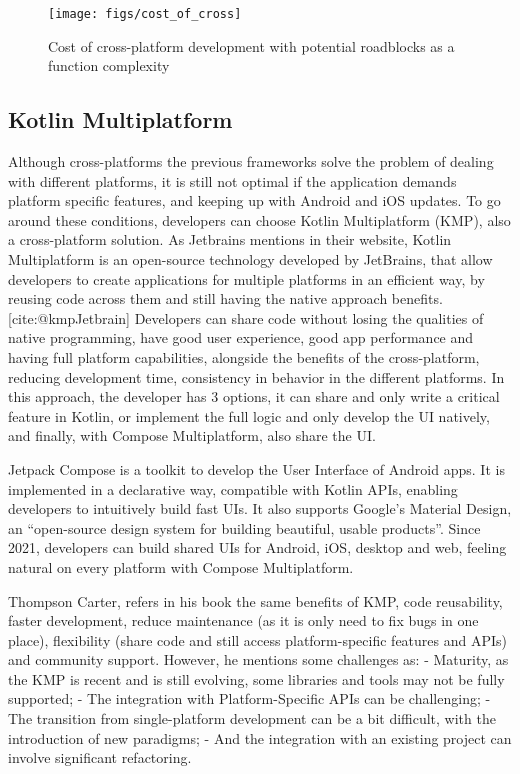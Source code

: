 \begin{figure}[h]
    \caption{Cost of cross-platform development with potential roadblocks as a function complexity\cite{Nagy2022}}
    \centering
    \texttt{[image: figs/cost\_of\_cross]}
    \label{fig:costCross}
\end{figure}


\subsection{Kotlin Multiplatform}\label{subsec:kotlin-multiplatform}

Although cross-platforms the previous frameworks solve the problem of dealing with different platforms, it is still not optimal if the application demands platform specific features, and keeping up with Android and iOS updates.
To go around these conditions, developers can choose Kotlin Multiplatform (KMP), also a cross-platform solution.
As Jetbrains mentions in their website, Kotlin Multiplatform is an open-source technology developed by JetBrains, that allow developers to create applications for multiple platforms in an efficient way, by reusing code across them and still having the native approach benefits.[cite:@kmpJetbrain]
Developers can share code without losing the qualities of native programming, have good user experience, good app performance and having full platform capabilities, alongside the benefits of the cross-platform, reducing development time, consistency in behavior in the different platforms.
In this approach, the developer has 3 options, it can share and only write a critical feature in Kotlin, or implement the full logic and only develop the UI natively, and finally, with Compose Multiplatform, also share the UI.\cite{kmp}

Jetpack Compose\cite{jetpack} is a toolkit to develop the User Interface of Android apps.
It is implemented in a declarative way, compatible with Kotlin APIs, enabling developers to intuitively build fast UIs.
It also supports Google's Material Design, an ``open-source design system for building beautiful, usable products''\cite{materialD}.
Since 2021, developers can build shared UIs for Android, iOS, desktop and web, feeling natural on every platform with Compose Multiplatform.\cite{compose-multi}

Thompson Carter, refers in his book\cite{kotlinInDepth} the same benefits of KMP, code reusability, faster development, reduce maintenance (as it is only need to fix bugs in one place), flexibility (share code and still access platform-specific features and APIs) and community support.
However, he mentions some challenges as:
- Maturity, as the KMP is recent and is still evolving, some libraries and tools may not be fully supported;
- The integration with Platform-Specific APIs can be challenging;
- The transition from single-platform development can be a bit difficult, with the introduction of new paradigms;
- And the integration with an existing project can involve significant refactoring.

